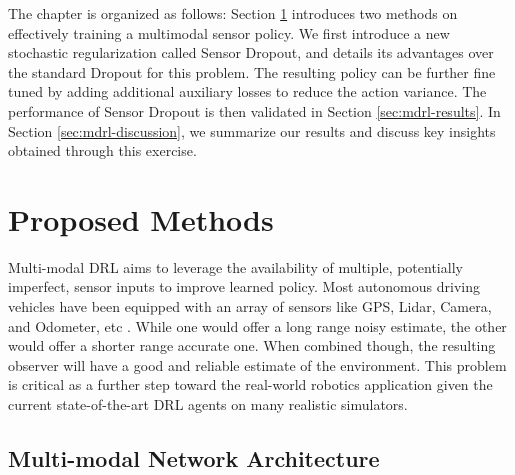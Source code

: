\documentclass[../thesis.tex]{subfiles}
\begin{document}
The chapter is organized as follows: 
Section \ref{sec:mdrl-proposed} introduces two methods on effectively training a multimodal sensor policy. We first introduce a new stochastic regularization called Sensor Dropout, and details its advantages over the standard Dropout for this problem. The resulting policy can be further fine tuned by adding additional auxiliary losses to reduce the action variance. The performance of Sensor Dropout is then validated in Section \ref{sec:mdrl-results}. In Section \ref{sec:mdrl-discussion}, we summarize our results and discuss key insights obtained through this exercise. 


\section{Proposed Methods} \label{sec:mdrl-proposed}

Multi-modal DRL aims to leverage the availability of multiple, potentially imperfect, sensor inputs to improve learned policy. Most autonomous driving vehicles have been equipped with an array of sensors like GPS, Lidar, Camera, and Odometer, etc \cite{hudda2013self}. While one would offer a long range noisy estimate, the other would offer a shorter range accurate one. When combined though, the resulting observer will have a good and reliable estimate of the environment. This problem is critical as a further step toward the real-world robotics application given the current state-of-the-art DRL agents on many realistic simulators. 


\subsection{Multi-modal Network Architecture}

\end{document}
